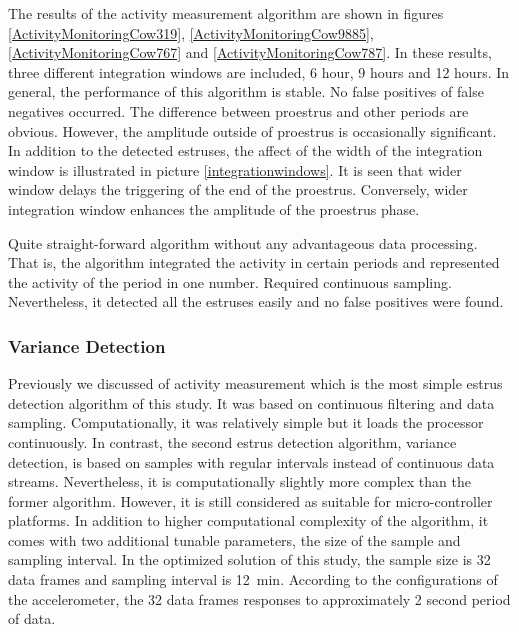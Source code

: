 \documentclass[english,12pt,a4paper,pdftex,elec,utf8]{aaltothesis}
\begin{document}
The results of the activity measurement algorithm are shown in figures \ref{ActivityMonitoringCow319}, \ref{ActivityMonitoringCow9885}, \ref{ActivityMonitoringCow767} and \ref{ActivityMonitoringCow787}. In these results, three different integration windows are included, 6 hour, 9 hours and 12 hours. In general, the performance of this algorithm is stable. No false positives of false negatives occurred. The difference between proestrus and other periods are obvious. However, the amplitude outside of proestrus is occasionally significant. In addition to the detected estruses, the affect of the width of the integration window is illustrated in picture \ref{integrationwindows}. It is seen that wider window delays the triggering of the end of the proestrus. Conversely, wider integration window enhances the amplitude of the proestrus phase. 

Quite straight-forward algorithm without any advantageous data processing. That is, the algorithm integrated the activity in certain periods and represented the activity of the period in one number. Required continuous sampling. Nevertheless, it detected all the estruses easily and no false positives were found. \\


\subsubsection{Variance Detection} \label{variancedetectionevaluation}




Previously we discussed of activity measurement which is the most simple estrus detection algorithm of this study. It was based on continuous filtering and data sampling. Computationally, it was relatively simple but it loads the processor continuously. In contrast, the second estrus detection algorithm, variance detection, is based on samples with regular intervals instead of continuous data streams. Nevertheless, it is computationally slightly more complex than the former algorithm. However, it is still considered as suitable for micro-controller platforms. In addition to higher computational complexity of the algorithm, it comes with two additional tunable parameters, the size of the sample and sampling interval. In the optimized solution of this study, the sample size is 32 data frames and sampling interval is \SI{12}{\minute}. According to the configurations of the accelerometer, the 32 data frames responses to approximately 2 second period of data. 
\end{document}
